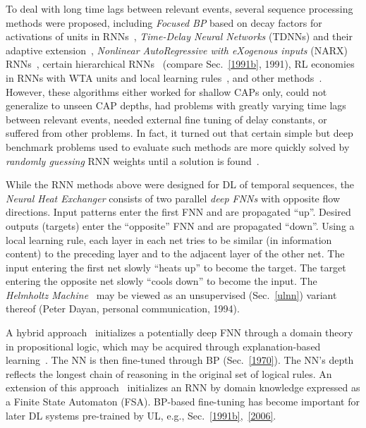 \documentclass[letterpaper]{article}
\begin{document}
\begin{CJK*}{UTF8}{gbsn}
\begin{sloppypar}
To deal with long time lags between relevant events, 
several sequence processing methods were proposed, 
including 
{\em Focused BP} based on decay 
factors for activations of units in RNNs~\citep{Mozer:89focus,Mozer:92nips},
{\em  Time-Delay Neural Networks} (TDNNs) \citep{Lang:90} and their 
adaptive extension~\citep{Bodenhausen:91},
{\em Nonlinear AutoRegressive with eXogenous inputs} (NARX) RNNs~\citep{Lin:96},
certain hierarchical RNNs~\citep{hihi:95} (compare Sec.~\ref{1991b}, 1991),
RL economies in RNNs with WTA units and local learning rules~\citep{Schmidhuber:89cs},
and other methods~\citep[e.g.,][]{Ring:93,Ring:94,Plate:93,Vries:91,Sun:93,Bengio:94}.
However, these algorithms either worked for shallow CAPs only,
could not generalize to unseen CAP depths,
had problems with greatly varying time lags between relevant events,
needed external fine tuning of delay constants,
or suffered from other problems.
In fact, it turned out that certain simple but deep benchmark problems 
used to evaluate such methods 
are more quickly solved by {\em randomly guessing} RNN weights until a solution is found~\citep{Hochreiter:96sintra}.

While the RNN methods above were designed for DL of temporal sequences,
the {\em Neural Heat Exchanger} \citep{heat90-96} consists of two parallel {\em deep FNNs} with opposite flow directions. Input patterns enter the first FNN and are propagated ``up''. Desired outputs (targets) enter the ``opposite'' FNN and are propagated ``down''. Using a local learning rule, each layer in each net tries to be similar (in information content) to the preceding layer and to the adjacent  layer of the other net. The input entering the first net slowly ``heats up'' to become the target. The target entering the opposite net slowly ``cools down'' to become the input. The {\em Helmholtz Machine}~\citep{Dayan:95,Dayan:96} may be viewed as an unsupervised (Sec.~\ref{ulnn})
variant thereof (Peter Dayan, personal communication, 1994). 



A hybrid approach~\citep{shavlik1989,towell1994} initializes a potentially deep FNN through 
a domain theory in propositional logic,
which may be acquired through explanation-based learning~\citep{mitchell1986,dejong1986,minton1989}.
The NN is then fine-tuned through BP (Sec.~\ref{1970}).
The NN's depth reflects the longest chain of reasoning in the original set of logical rules.
An extension of this approach~\citep{maclin1993,shavlik1994} initializes an RNN by 
domain knowledge expressed as a Finite State Automaton (FSA).
BP-based fine-tuning has become important for later DL systems 
pre-trained by UL, e.g., Sec.~\ref{1991b},~\ref{2006}.


\end{sloppypar}
\end{CJK*}
\end{document}
